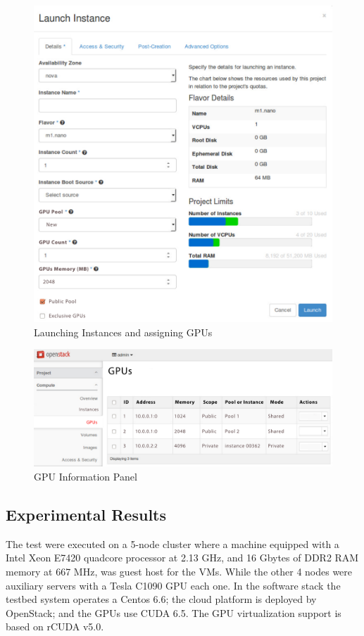 \documentclass[a4paper,twoside]{article}
\begin{document}
\begin{figure}[htb]
  \centering
  \includegraphics[width=\linewidth]{images/UI-launch.pdf}
  \caption{Launching Instances and assigning GPUs}
  \label{fig:ui-launch}
\end{figure}
  
\begin{figure}[htb]
  \centering
  \includegraphics[width=\linewidth]{images/UI-rgpus.pdf}
  \caption{GPU Information Panel}
  \label{fig:ui-rgpus}
\end{figure}

\subsection{Experimental Results}
The test were executed on a 5-node cluster where a machine
equipped with a Intel Xeon E7420 quadcore processor at
2.13 GHz, and 16 Gbytes of DDR2 RAM memory at 667
MHz, was guest host for the VMs. While the other 4 nodes
were auxiliary servers with a Tesla C1090 GPU each one. 
In the software stack the testbed system operates a
Centos 6.6; the cloud platform is deployed by OpenStack; and
the GPUs use CUDA 6.5. The GPU virtualization support is
based on rCUDA v5.0.
\end{document}
